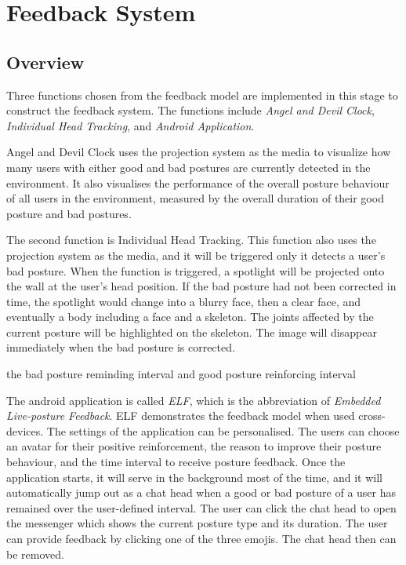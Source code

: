 \chapter{Feedback System}

\section{Overview}
Three functions chosen from the feedback model are implemented in this stage to construct the feedback system. The functions include \textit{Angel and Devil Clock}, \textit{Individual Head Tracking}, and \textit{Android Application}.

Angel and Devil Clock uses the projection system as the media to visualize how many users with either good and bad postures are currently detected in the environment. It also visualises the performance of the overall posture behaviour of all users in the environment, measured by the overall duration of their good posture and bad postures.

The second function is Individual Head Tracking. This function also uses the projection system as the media, and it will be triggered only it detects a user's bad posture. When the function is triggered, a spotlight will be projected onto the wall at the user's head position. If the bad posture had not been corrected in time, the spotlight would change into a blurry face, then a clear face, and eventually a body including a face and a skeleton. The joints affected by the current posture will be highlighted on the skeleton. The image will disappear immediately when the bad posture is corrected.

the bad posture reminding interval and good posture reinforcing interval

The android application is called \textit{ELF}, which is the abbreviation of \textit{Embedded Live-posture Feedback}. ELF demonstrates the feedback model when used cross-devices. The settings of the application can be personalised. The users can choose an avatar for their positive reinforcement, the reason to improve their posture behaviour, and the time interval to receive posture feedback. Once the application starts, it will serve in the background most of the time, and it will automatically jump out as a chat head when a good or bad posture of a user has remained over the user-defined interval. The user can click the chat head to open the messenger which shows the current posture type and its duration. The user can provide feedback by clicking one of the three emojis. The chat head then can be removed.

